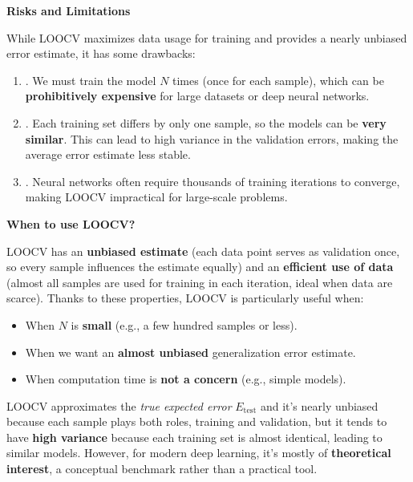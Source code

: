\highspace
\begin{flushleft}
    \textcolor{Red2}{ \textbf{Risks and Limitations}}
\end{flushleft}
While LOOCV maximizes data usage for training and provides a nearly unbiased error estimate, it has some drawbacks:
\begin{enumerate}
    \item {}. We must train the model $N$ times (once for each sample), which can be \textbf{prohibitively expensive} for large datasets or deep neural networks.
    \item {}. Each training set differs by only one sample, so the models can be \textbf{very similar}. This can lead to high variance in the validation errors, making the average error estimate less stable.
    \item {}. Neural networks often require thousands of training iterations to converge, making LOOCV impractical for large-scale problems.
\end{enumerate}

\highspace
\begin{flushleft}
    \textcolor{Green3}{ \textbf{When to use LOOCV?}}
\end{flushleft}
LOOCV has an \textbf{unbiased estimate} (each data point serves as validation once, so every sample influences the estimate equally) and an \textbf{efficient use of data} (almost all samples are used for training in each iteration, ideal when data are scarce). Thanks to these properties, LOOCV is particularly useful when:
\begin{itemize}
    \item[\textcolor{Green3}{\faIcon{check}}] When $N$ is \textbf{small} (e.g., a few hundred samples or less).
    \item[\textcolor{Green3}{\faIcon{check}}] When we want an \textbf{almost unbiased} generalization error estimate.
    \item[\textcolor{Green3}{\faIcon{check}}] When computation time is \textbf{not a concern} (e.g., simple models).
\end{itemize}
LOOCV approximates the \emph{true expected error} $E_{\text{test}}$ and it's nearly unbiased because each sample plays both roles, training and validation, but it tends to have \textbf{high variance} because each training set is almost identical, leading to similar models. However, for modern deep learning, it's mostly of \textbf{theoretical interest}, a conceptual benchmark rather than a practical tool.